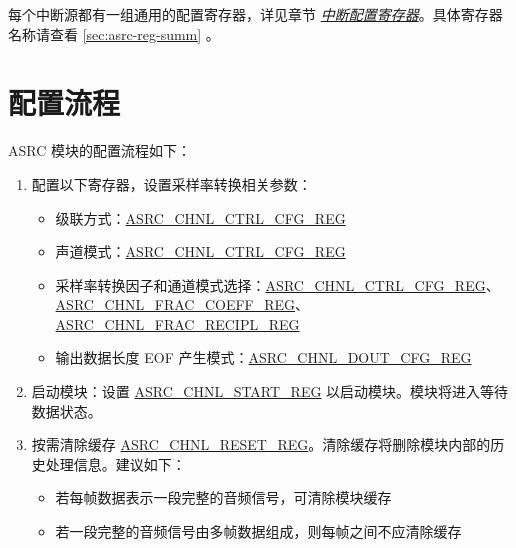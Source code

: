 \documentclass[main\_\_CN.tex]{subfiles}
\begin{document}
每个中断源都有一组通用的配置寄存器，详见章节 \hyperref[interrupt-config-registers]{\textit{中断配置寄存器}}。具体寄存器名称请查看 \ref{sec:asrc-reg-summ} \textit{}。




\section{配置流程}
\label{sec:asrc-prog-procedures}

ASRC 模块的配置流程如下：

\begin{enumerate}
  \item 配置以下寄存器，设置采样率转换相关参数：

  \begin{itemize}
    \item 级联方式：\hyperref[regdesc:ASRCCHNL0CTRLCFGREG]{ASRC\_CHNL\_CTRL\_CFG\_REG}
    \item 声道模式：\hyperref[regdesc:ASRCCHNL0CTRLCFGREG]{ASRC\_CHNL\_CTRL\_CFG\_REG}
    \item 采样率转换因子和通道模式选择：\hyperref[regdesc:ASRCCHNL0CTRLCFGREG]{ASRC\_CHNL\_CTRL\_CFG\_REG}、\hyperref[regdesc:ASRCCHNL0FRACCOEFFREG]{ASRC\_CHNL\_FRAC\_COEFF\_REG}、\hyperref[regdesc:ASRCCHNL0FRACRECIPLREG]{ASRC\_CHNL\_FRAC\_RECIPL\_REG}
    \item 输出数据长度 EOF 产生模式：\hyperref[regdesc:ASRCCHNL0DOUTCFGREG]{ASRC\_CHNL\_DOUT\_CFG\_REG}
  \end{itemize}

  \item 启动模块：设置 \hyperref[regdesc:ASRCCHNL0STARTREG]{ASRC\_CHNL\_START\_REG} 以启动模块。模块将进入等待数据状态。

  \item 按需清除缓存 \hyperref[regdesc:ASRCCHNL0RESETREG]{ASRC\_CHNL\_RESET\_REG}。清除缓存将删除模块内部的历史处理信息。建议如下：

  \begin{itemize}
    \item 若每帧数据表示一段完整的音频信号，可清除模块缓存
    \item 若一段完整的音频信号由多帧数据组成，则每帧之间不应清除缓存
  \end{itemize}


\end{enumerate}
\end{document}
